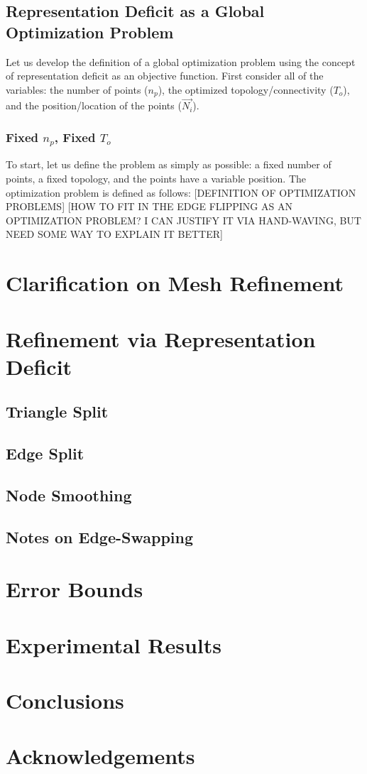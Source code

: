 \documentclass[11pt]{article}
\begin{document}
\subsection{Representation Deficit as a Global Optimization Problem}
Let us develop the definition of a global optimization problem using the
concept of representation deficit as an objective function. First
consider all of the variables: the number of points ($n_p$), the
optimized topology/connectivity ($T_o$), and the position/location of
the points ($\vec{N_i}$).
\subsubsection{Fixed $n_p$, Fixed $T_o$}
To start, let us define the problem as simply
as possible: a fixed number of points, a fixed topology, and the points
have a variable position.  The optimization problem is defined as
follows:
[DEFINITION OF OPTIMIZATION PROBLEMS]
[HOW TO FIT IN THE EDGE FLIPPING AS AN OPTIMIZATION PROBLEM? I CAN
JUSTIFY IT VIA HAND-WAVING, BUT NEED SOME WAY TO EXPLAIN IT BETTER]
\section{Clarification on Mesh Refinement}
\section{Refinement via Representation Deficit}
\subsection{Triangle Split}
\subsection{Edge Split}
\subsection{Node Smoothing}
\subsection{Notes on Edge-Swapping}
\section{Error Bounds}
\section{Experimental Results}
\section{Conclusions}
\section{Acknowledgements}
\end{document}
